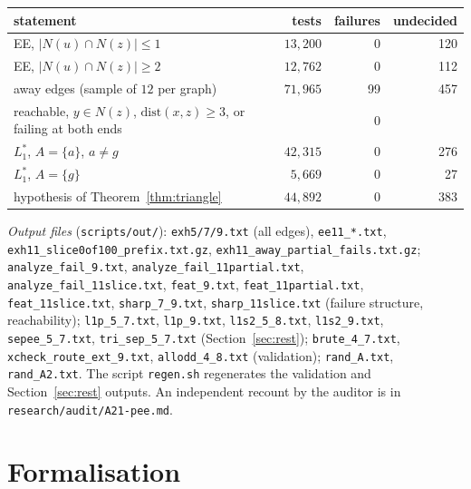 \documentclass[11pt]{amsart}
\theoremstyle{definition}
\begin{document}
\begin{center}
\begin{tabular}{lrrr}
\toprule
statement & tests & failures & undecided \\
\midrule
EE, $|N(u)\cap N(z)|\le1$ & $13{,}200$ & 0 & 120 \\
EE, $|N(u)\cap N(z)|\ge2$ & $12{,}762$ & 0 & 112 \\
away edges (sample of $12$ per graph) & $71{,}965$ & 99 & 457 \\
\quad reachable, $y\in N(z)$, $\mathrm{dist}(x,z)\ge3$, or failing at both ends & & 0 & \\
$L_1^*$, $A=\{a\}$, $a\ne g$ & $42{,}315$ & 0 & 276 \\
$L_1^*$, $A=\{g\}$ & $5{,}669$ & 0 & 27 \\
hypothesis of Theorem~\ref{thm:triangle} & $44{,}892$ & 0 & 383 \\
\bottomrule
\end{tabular}
\end{center}

{\raggedright\emph{Output files} (\texttt{scripts/out/}): \texttt{exh5/7/9.txt} (all edges),
\texttt{ee11\_*.txt}, \texttt{exh11\_slice0of100\_prefix.txt.gz},
\texttt{exh11\_away\_partial\_fails.txt.gz}; \texttt{analyze\_fail\_9.txt},
\texttt{analyze\_fail\_11partial.txt}, \texttt{analyze\_fail\_11slice.txt}, \texttt{feat\_9.txt},
\texttt{feat\_11partial.txt}, \texttt{feat\_11slice.txt}, \texttt{sharp\_7\_9.txt},
\texttt{sharp\_11slice.txt} (failure structure, reachability);
\texttt{l1p\_5\_7.txt}, \texttt{l1p\_9.txt}, \texttt{l1s2\_5\_8.txt}, \texttt{l1s2\_9.txt},
\texttt{sepee\_5\_7.txt}, \texttt{tri\_sep\_5\_7.txt} (Section~\ref{sec:rest});
\texttt{brute\_4\_7.txt}, \texttt{xcheck\_route\_ext\_9.txt}, \texttt{allodd\_4\_8.txt} (validation);
\texttt{rand\_A.txt}, \texttt{rand\_A2.txt}. The script \texttt{regen.sh} regenerates the validation
and Section~\ref{sec:rest} outputs. An independent recount by the auditor is in
\texttt{research/audit/A21-pee.md}.\par}

\section{Formalisation}\label{sec:lean}
\end{document}
